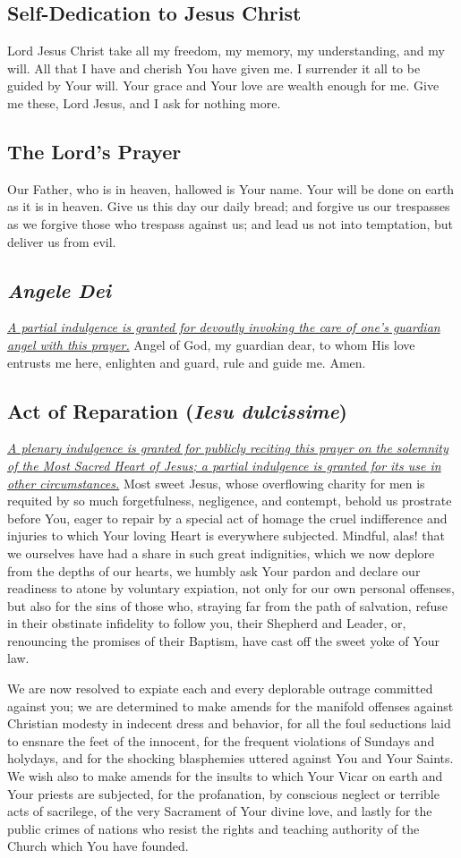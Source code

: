 \documentclass[12pt]{article}
\newcommand{\prayertitle}[1]{\subsection{#1}}
\newcommand{\indulgencedprayertitle}[1]{\prayertitle{#1 \protect\kreuz}}
\newcommand{\foreign}[1]{\textsl{#1}}
\newcommand{\note}[1]{{\small{\textsl{#1}}}\newline}
\newcommand{\linkednote}[2]{\hyperlink{#1}{\note{#2}}}
\begin{document}
\prayertitle{Self-Dedication to Jesus Christ}
Lord Jesus Christ take all my freedom, my memory, my understanding, and my will.
All that I have and cherish You have given me.
I surrender it all to be guided by Your will.
Your grace and Your love are wealth enough for me.
Give me these, Lord Jesus, and I ask for nothing more.

\prayertitle{The Lord's Prayer}
Our Father, who is in heaven, hallowed is Your name.
Your will be done on earth as it is in heaven.
Give us this day our daily bread;
and forgive us our trespasses as we forgive those who trespass against us;
and lead us not into temptation, but deliver us from evil.

\indulgencedprayertitle{\foreign{Angele Dei}}
\linkednote{grant18}{A partial indulgence is granted for devoutly invoking the care of one's guardian angel with this prayer.}
Angel of God, my guardian dear, to whom His love entrusts me here, enlighten and guard, rule and guide me. Amen.

\indulgencedprayertitle{Act of Reparation (\foreign{Iesu dulcissime})}
\linkednote{grant3}{A plenary indulgence is granted for publicly reciting this prayer on the solemnity of the Most Sacred Heart of Jesus;
a partial indulgence is granted for its use in other circumstances.}
Most sweet Jesus, whose overflowing charity for men is requited by so much forgetfulness, negligence, and contempt, behold us prostrate before You, eager to repair by a special act of homage the cruel indifference and injuries to which Your loving Heart is everywhere subjected.
Mindful, alas! that we ourselves have had a share in such great indignities, which we now deplore from the depths of our hearts, we humbly ask Your pardon and declare our readiness to atone by voluntary expiation, not only for our own personal offenses, but also for the sins of those who, straying far from the path of salvation, refuse in their obstinate infidelity to follow you, their Shepherd and Leader, or, renouncing the promises of their Baptism, have cast off the sweet yoke of Your law.

We are now resolved to expiate each and every deplorable outrage committed against you; we are determined to make amends for the manifold offenses against Christian modesty in indecent dress and behavior, for all the foul seductions laid to ensnare the feet of the innocent, for the frequent violations of Sundays and holydays, and for the shocking blasphemies uttered against You and Your Saints.
We wish also to make amends for the insults to which Your Vicar on earth and Your priests are subjected, for the profanation, by conscious neglect or terrible acts of sacrilege, of the very Sacrament of Your divine love, and lastly for the public crimes of nations who
resist the rights and teaching authority of the Church which You have founded.
\end{document}
